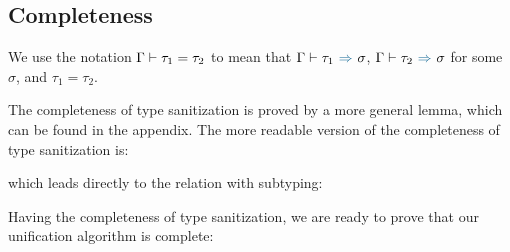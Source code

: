 \subsection{Completeness}

We use the notation $\Gamma \vdash \tau_1 = \tau_2$ to mean that
$\tctx \byinf \tau_1 \infto \sigma$, $\tctx \byinf \tau_2 \infto \sigma$ for
some $\sigma$,
and $\tau_1 = \tau_2$.

The completeness of type sanitization is proved by a more general lemma, which
can be found in the appendix. The more readable version of the completeness of
type sanitization is:

\begin{corollary}[\TypeSanitizationCompletenessPrettyName]
  \label{lemma:\TypeSanitizationCompletenessPrettyName}
  \TypeSanitizationCompletenessPrettyBody
\end{corollary}

\noindent which leads directly to the relation with subtyping:

\begin{lemma}[\TypeSanitizationCompletenessUnificationName]\leavevmode
  \label{lemma:\TypeSanitizationCompletenessUnificationName}
  \TypeSanitizationCompletenessUnificationBody
\end{lemma}

Having the completeness of type sanitization, we are ready to prove that our
unification algorithm is complete:

\begin{lemma}[\UnificationCompletenessName]
  \label{lemma:\UnificationCompletenessName}
    \UnificationCompletenessBody
\end{lemma}
